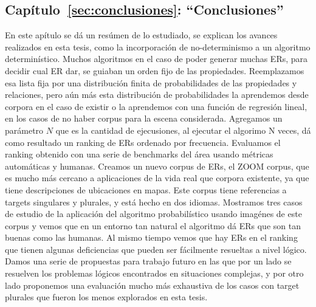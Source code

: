 \subsection{Cap\'itulo~\ref{sec:conclusiones}: ``Conclusiones''} En este ap\'itulo se d\'a un res\'umen de lo estudiado, se explican los avances realizados en esta tesis, como la incorporaci\'on de no-determinismo a un algoritmo determin\'istico. Muchos algoritmos en el caso de poder generar muchas ERs, para decidir cual ER dar, se guiaban un orden fijo de las propiedades. Reemplazamos esa lista fija por una distribuci\'on finita de probabilidades de las propiedades y relaciones, pero a\'un m\'as esta distribuci\'on de probabilidades la aprendemos desde corpora en el caso de existir o la aprendemos con una funci\'on de regresi\'on lineal, en los casos de no haber corpus para la escena considerada. Agregamos un par\'ametro $N$ que es la cantidad de ejecusiones, al ejecutar el algorimo N veces, d\'a como resultado un ranking de ERs ordenado por frecuencia. Evaluamos el ranking obtenido con una serie de benchmarks del \'area usando m\'etricas autom\'aticas y humanas. Creamos un nuevo corpus de ERs, el ZOOM corpus, que es mucho m\'as cercano a aplicaciones de la vida real que corpora existente, ya que tiene descripciones de ubicaciones en mapas. Este corpus tiene referencias a targets singulares y plurales, y est\'a hecho en dos idiomas. Mostramos tres casos de estudio de la aplicaci\'on del algoritmo probabil\'istico usando imag\'enes de este corpus y vemos que en un entorno tan natural el algoritmo d\'a ERs que son tan buenas como las humanas. Al mismo tiempo vemos que hay ERs en el ranking que tienen algunas deficiencias que pueden ser f\'acilmente resueltas a nivel l\'ogico. Damos una serie de propuestas para trabajo futuro en las que por un lado se resuelven los problemas l\'ogicos encontrados en situaciones complejas, y por otro lado proponemos una evaluaci\'on mucho m\'as exhaustiva de los casos con target plurales que fueron los menos explorados en esta tesis.



